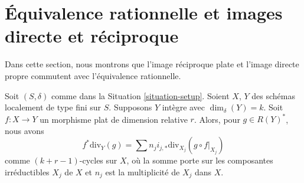 \section{Équivalence rationnelle et images directe et réciproque}
\label{section-properties-rational-equivalence}

\noindent
Dans cette section, nous montrons que l'image réciproque plate et l'image directe propre
commutent avec l'équivalence rationnelle.

\begin{lemma}
\label{lemma-prepare-flat-pullback-rational-equivalence}
Soit $(S, \delta)$ comme dans la Situation \ref{situation-setup}.
Soient $X$, $Y$ des schémas localement de type fini sur $S$.
Supposons $Y$ intègre avec $\dim_\delta(Y) = k$.
Soit $f : X \to Y$ un morphisme plat de
dimension relative $r$. Alors, pour $g \in R(Y)^*$, nous avons
$$
f^*\text{div}_Y(g) =
\sum n_j i_{j, *}\text{div}_{X_j}(g \circ f|_{X_j})
$$
comme $(k + r - 1)$-cycles sur $X$, où la somme porte sur les composantes
irréductibles $X_j$ de $X$ et $n_j$ est la multiplicité de $X_j$ dans $X$.
\end{lemma}

